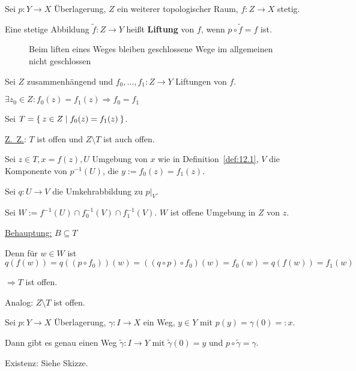 \begin{definition}
    Sei $p: Y \rightarrow X$ Überlagerung, $Z$ ein weiterer topologischer
    Raum, $f:Z \rightarrow X$ stetig.

    Eine stetige Abbildung $\tilde{f}: Z \rightarrow Y$ heißt
    \textbf{Liftung} von $f$, wenn $p \circ \tilde{f} = f$ ist.
\end{definition}

\begin{figure}
    \centering
    
    \caption{Beim liften eines Weges bleiben geschlossene Wege im allgemeinen nicht geschlossen}
    \label{fig:satz-seifert-van-kampen}
\end{figure}

\begin{korollar}
    Sei $Z$ zusammenhängend und $f_0, \dots, f_1: Z \rightarrow Y$
    Liftungen von $f$.

    $\exists z_0 \in Z: f_0(z) = f_1(z) \Rightarrow f_0 = f_1$
\end{korollar}

\begin{beweis}
    Sei $T = \Set{z \in Z | f_0(z) = f_1(z)}$.

    \underline{Z.~Z.}: $T$ ist offen und $Z \setminus T$ ist auch offen.

    Sei $z \in T, x = f(z), U$ Umgebung von $x$ wie in Definition~\ref{def:12.1},
    $V$ die Komponente von $p^{-1}(U)$, die $y:=f_0(z) = f_1(z)$.

    Sei $q:U \rightarrow V$ die Umkehrabbildung zu $p|_V$.

    Sei $W:= f^{-1}(U) \cap f_0^{-1}(V) \cap f_1^{-1}(V)$. $W$ ist 
    offene Umgebung in $Z$ von $z$.

    \underline{Behauptung:} $B \subseteq T$

    Denn für $w \in W$ ist $q(f(w)) = q((p \circ f_0))(w) = ((q \circ p) \circ f_0) (w) = f_0(w) = q(f(w)) = f_1(w)$

    $\Rightarrow T$ ist offen.

    Analog: $Z \setminus T$ ist offen.
\end{beweis}

\begin{satz}
    Sei $p: Y \rightarrow X$ Überlagerung, $\gamma: I \rightarrow X$
    ein Weg, $y \in Y$ mit $p(y) = \gamma(0) =: x$.

    Dann gibt es genau einen Weg $\tilde{\gamma}: I \rightarrow Y$
    mit $\tilde{\gamma}(0)=y$ und $p \circ \tilde{\gamma} = \gamma$.
\end{satz}

\begin{beweis}
Existenz: Siehe Skizze.
\end{beweis}


